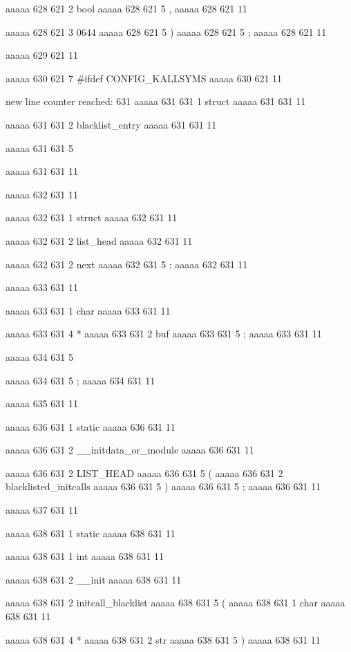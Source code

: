 aaaaa 628 621
2
bool
aaaaa 628 621
5
,
aaaaa 628 621
11
 
aaaaa 628 621
3
0644
aaaaa 628 621
5
)
aaaaa 628 621
5
;
aaaaa 628 621
11


aaaaa 629 621
11


aaaaa 630 621
7
#ifdef CONFIG_KALLSYMS
aaaaa 630 621
11


new line counter reached: 631
aaaaa 631 631
1
struct
aaaaa 631 631
11
 
aaaaa 631 631
2
blacklist_entry
aaaaa 631 631
11
 
aaaaa 631 631
5
{
aaaaa 631 631
11


aaaaa 632 631
11
	
aaaaa 632 631
1
struct
aaaaa 632 631
11
 
aaaaa 632 631
2
list_head
aaaaa 632 631
11
 
aaaaa 632 631
2
next
aaaaa 632 631
5
;
aaaaa 632 631
11


aaaaa 633 631
11
	
aaaaa 633 631
1
char
aaaaa 633 631
11
 
aaaaa 633 631
4
*
aaaaa 633 631
2
buf
aaaaa 633 631
5
;
aaaaa 633 631
11


aaaaa 634 631
5
}
aaaaa 634 631
5
;
aaaaa 634 631
11


aaaaa 635 631
11


aaaaa 636 631
1
static
aaaaa 636 631
11
 
aaaaa 636 631
2
__initdata_or_module
aaaaa 636 631
11
 
aaaaa 636 631
2
LIST_HEAD
aaaaa 636 631
5
(
aaaaa 636 631
2
blacklisted_initcalls
aaaaa 636 631
5
)
aaaaa 636 631
5
;
aaaaa 636 631
11


aaaaa 637 631
11


aaaaa 638 631
1
static
aaaaa 638 631
11
 
aaaaa 638 631
1
int
aaaaa 638 631
11
 
aaaaa 638 631
2
__init
aaaaa 638 631
11
 
aaaaa 638 631
2
initcall_blacklist
aaaaa 638 631
5
(
aaaaa 638 631
1
char
aaaaa 638 631
11
 
aaaaa 638 631
4
*
aaaaa 638 631
2
str
aaaaa 638 631
5
)
aaaaa 638 631
11


